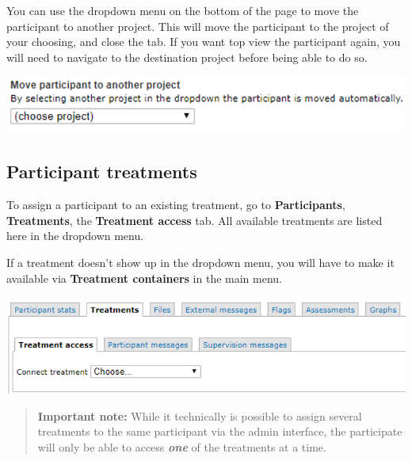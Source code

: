 \documentclass[
]{book}
\begin{document}
You can use the dropdown menu on the bottom of the page to move the participant to another project. This will move the participant to the project of your choosing, and close the tab. If you want top view the participant again, you will need to navigate to the destination project before being able to do so.

\includegraphics{images/new-images/participantMoveProject.png}

\subsection{Participant treatments}\label{parttreat}

To assign a participant to an existing treatment, go to \textbf{Participants}, \textbf{Treatments}, the \textbf{Treatment access} tab. All available treatments are listed here in the dropdown menu.

If a treatment doesn't show up in the dropdown menu, you will have to make it available via \textbf{Treatment containers} in the main menu.

\includegraphics{images/new-images/participantTreatConnect.png}

\begin{quote}
\textbf{Important note:} While it technically is possible to assign several treatments to the same participant via the admin interface, the participate will only be able to access \emph{\textbf{one}} of the treatments at a time.
\end{quote}
\end{document}

